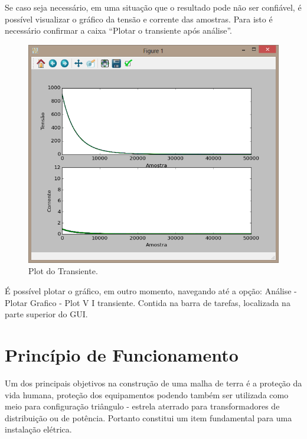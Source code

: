 \documentclass[a4paper, 10pt]{article}
\begin{document}
Se caso seja necessário, em uma situação que o resultado pode não ser confiável, 
é possível visualizar o gráfico da tensão e corrente das amostras. Para isto 
é necessário confirmar a caixa ``Plotar o transiente após análise''.

\begin{figure}[H]
        \caption{\label{fig_plt_transiente}Plot do Transiente.}
	    \begin{center}
            \includegraphics[scale=0.4]{../fotos/execucao/plot_transiente.png}
	    \end{center}
\end{figure}


É possível plotar o gráfico, em outro momento, navegando até a opção: Análise -
Plotar Grafico - Plot V I transiente. Contida na barra de tarefas, localizada
na parte superior do GUI.


\section{Princípio de Funcionamento}

Um dos principais objetivos na construção de uma malha de terra é a proteção da 
vida humana, proteção dos equipamentos podendo também ser utilizada como 
meio para configuração triângulo - estrela aterrado para transformadores 
de distribuição ou de potência. Portanto constitui um item fundamental para 
uma instalação elétrica. 
\end{document}
